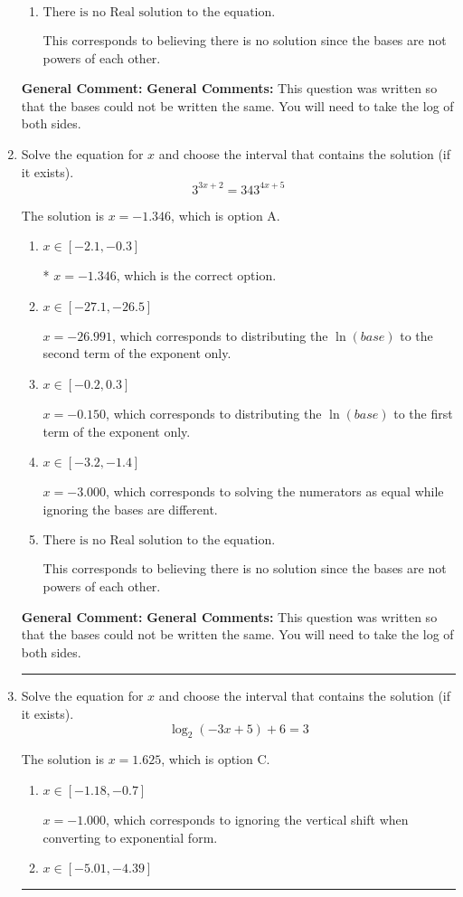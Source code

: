 \documentclass{extbook}[14pt]
\newcommand{\litem}[1]{\item #1

\rule{\textwidth}{0.4pt}}
\begin{document}
\begin{enumerate}
{\begin{enumerate}[label=\Alph*.]
* $x = -0.667$, which is the correct option.
\item \( \text{There is no Real solution to the equation.} \)

This corresponds to believing there is no solution since the bases are not powers of each other.
\end{enumerate}

\textbf{General Comment:} \textbf{General Comments:} This question was written so that the bases could not be written the same. You will need to take the log of both sides.
}
\litem{
Solve the equation for $x$ and choose the interval that contains the solution (if it exists).
\[ 3^{3x+2} = 343^{4x+5} \]

The solution is \( x = -1.346 \), which is option A.\begin{enumerate}[label=\Alph*.]
\item \( x \in [-2.1, -0.3] \)

* $x = -1.346$, which is the correct option.
\item \( x \in [-27.1, -26.5] \)

$x = -26.991$, which corresponds to distributing the $\ln(base)$ to the second term of the exponent only.
\item \( x \in [-0.2, 0.3] \)

$x = -0.150$, which corresponds to distributing the $\ln(base)$ to the first term of the exponent only.
\item \( x \in [-3.2, -1.4] \)

$x = -3.000$, which corresponds to solving the numerators as equal while ignoring the bases are different.
\item \( \text{There is no Real solution to the equation.} \)

This corresponds to believing there is no solution since the bases are not powers of each other.
\end{enumerate}

\textbf{General Comment:} \textbf{General Comments:} This question was written so that the bases could not be written the same. You will need to take the log of both sides.
}
\litem{
Solve the equation for $x$ and choose the interval that contains the solution (if it exists).
\[ \log_{2}{(-3x+5)}+6 = 3 \]

The solution is \( x = 1.625 \), which is option C.\begin{enumerate}[label=\Alph*.]
\item \( x \in [-1.18, -0.7] \)

$x = -1.000$, which corresponds to ignoring the vertical shift when converting to exponential form.
\item \( x \in [-5.01, -4.39] \)


\end{enumerate}}
\end{enumerate}
\end{document}
